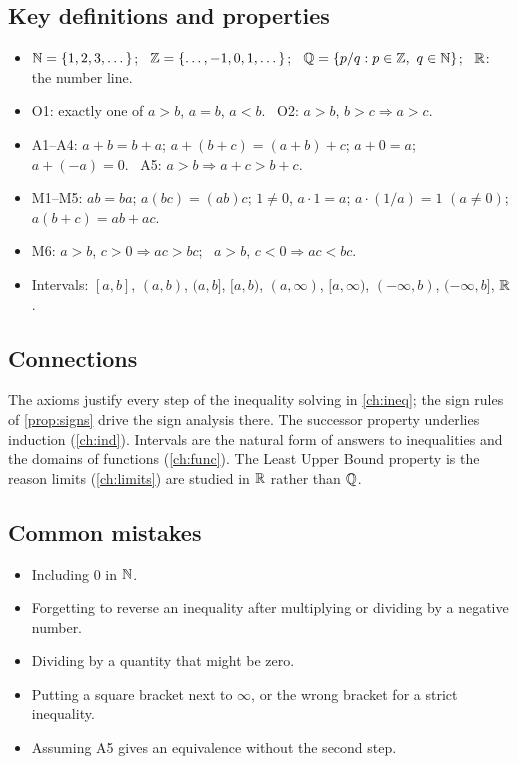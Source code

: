 \subsection*{Key definitions and properties}
\begin{itemize}
  \item $\mathbb{N}=\{1,2,3,\dots\}$; \ $\mathbb{Z}=\{\dots,-1,0,1,\dots\}$; \ $\mathbb{Q}=\{p/q: p\in\mathbb{Z},\ q\in\mathbb{N}\}$; \ $\mathbb{R}$: the number line.
  \item O1: exactly one of $a>b$, $a=b$, $a<b$. \ O2: $a>b$, $b>c\Rightarrow a>c$.
  \item A1--A4: $a+b=b+a$; $a+(b+c)=(a+b)+c$; $a+0=a$; $a+(-a)=0$. \ A5: $a>b\Rightarrow a+c>b+c$.
  \item M1--M5: $ab=ba$; $a(bc)=(ab)c$; $1\ne0$, $a\cdot1=a$; $a\cdot(1/a)=1$ $(a\ne0)$; $a(b+c)=ab+ac$.
  \item M6: $a>b$, $c>0\Rightarrow ac>bc$; \ $a>b$, $c<0\Rightarrow ac<bc$.
  \item Intervals: $[a,b]$, $(a,b)$, $(a,b]$, $[a,b)$, $(a,\infty)$, $[a,\infty)$, $(-\infty,b)$, $(-\infty,b]$, $\mathbb{R}$.
\end{itemize}

\subsection*{Connections}
The axioms justify every step of the inequality solving in \cref{ch:ineq}; the sign rules of
\cref{prop:signs} drive the sign analysis there. The successor property underlies induction (\cref{ch:ind}).
Intervals are the natural form of answers to inequalities and the domains of functions (\cref{ch:func}). The
Least Upper Bound property is the reason limits (\cref{ch:limits}) are studied in $\mathbb{R}$ rather than $\mathbb{Q}$.

\subsection*{Common mistakes}
\begin{itemize}
  \item Including $0$ in $\mathbb{N}$.
  \item Forgetting to reverse an inequality after multiplying or dividing by a negative number.
  \item Dividing by a quantity that might be zero.
  \item Putting a square bracket next to $\infty$, or the wrong bracket for a strict inequality.
  \item Assuming A5 gives an equivalence without the second step.
\end{itemize}

